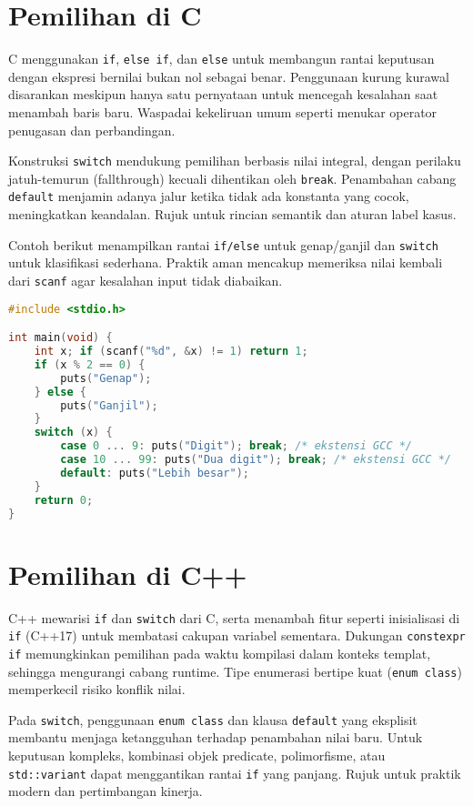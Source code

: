 \documentclass[../main.tex]{subfiles}
\begin{document}
\section{Pemilihan di C}
C menggunakan \texttt{if}, \texttt{else if}, dan \texttt{else} untuk membangun rantai keputusan dengan ekspresi bernilai bukan nol sebagai benar. Penggunaan kurung kurawal disarankan meskipun hanya satu pernyataan untuk mencegah kesalahan saat menambah baris baru. Waspadai kekeliruan umum seperti menukar operator penugasan dan perbandingan.

Konstruksi \texttt{switch} mendukung pemilihan berbasis nilai integral, dengan perilaku jatuh-temurun (fallthrough) kecuali dihentikan oleh \texttt{break}. Penambahan cabang \texttt{default} menjamin adanya jalur ketika tidak ada konstanta yang cocok, meningkatkan keandalan. Rujuk \textcite{gnu-c-manual,iso-c-draft-n1570} untuk rincian semantik dan aturan label kasus.

Contoh berikut menampilkan rantai \texttt{if/else} untuk genap/ganjil dan \texttt{switch} untuk klasifikasi sederhana. Praktik aman mencakup memeriksa nilai kembali dari \texttt{scanf} agar kesalahan input tidak diabaikan.

\begin{lstlisting}[language=C, caption={Contoh pemilihan di C}, label={lst:c-if}]
#include <stdio.h>

int main(void) {
    int x; if (scanf("%d", &x) != 1) return 1;
    if (x % 2 == 0) {
        puts("Genap");
    } else {
        puts("Ganjil");
    }
    switch (x) {
        case 0 ... 9: puts("Digit"); break; /* ekstensi GCC */
        case 10 ... 99: puts("Dua digit"); break; /* ekstensi GCC */
        default: puts("Lebih besar");
    }
    return 0;
}
\end{lstlisting}

\section{Pemilihan di C++}
C++ mewarisi \texttt{if} dan \texttt{switch} dari C, serta menambah fitur seperti inisialisasi di \texttt{if} (C++17) untuk membatasi cakupan variabel sementara. Dukungan \texttt{constexpr if} memungkinkan pemilihan pada waktu kompilasi dalam konteks templat, sehingga mengurangi cabang runtime. Tipe enumerasi bertipe kuat (\texttt{enum class}) memperkecil risiko konflik nilai.

Pada \texttt{switch}, penggunaan \texttt{enum class} dan klausa \texttt{default} yang eksplisit membantu menjaga ketangguhan terhadap penambahan nilai baru. Untuk keputusan kompleks, kombinasi objek predicate, polimorfisme, atau \texttt{std::variant} dapat menggantikan rantai \texttt{if} yang panjang. Rujuk \textcite{cpp-reference} untuk praktik modern dan pertimbangan kinerja.
\end{document}
